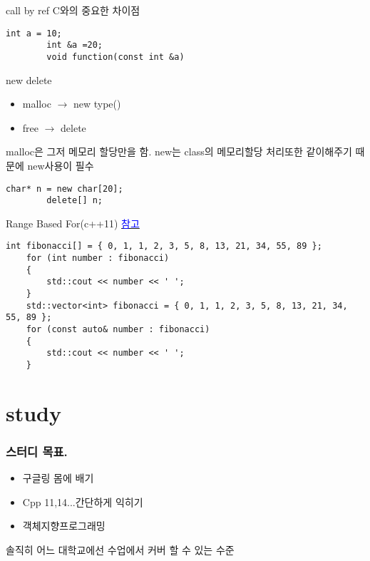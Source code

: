 \documentclass[10pt]{beamer}
\begin{document}

\begin{frame}[fragile]{call by ref}
    C와의 중요한 차이점
    \begin{lstlisting}[style = CStyle]
        int a = 10;
        int &a =20;
        void function(const int &a)
    \end{lstlisting}
\end{frame}

\begin{frame}[fragile]{new delete}
    \begin{itemize}
        \item malloc $\rightarrow$ new type()
        \item free $\rightarrow$ delete 
    \end{itemize}
    malloc은 그저 메모리 할당만을 함. new는 class의 메모리할당 처리또한 같이해주기 때문에 new사용이 필수
    \begin{lstlisting}[style = CStyle]
        char* n = new char[20];
        delete[] n;
    \end{lstlisting}
\end{frame}


\begin{frame}[fragile]{Range Based For(c++11)}
    \href{https://www.youtube.com/watch?v=sVoz36DYK5s&list=PLW_uvsSPlijtSmrhajc3Y02G86lOieQOb}{\textcolor{blue}{참고}}
    
    \begin{lstlisting}[style = CStyle]
    int fibonacci[] = { 0, 1, 1, 2, 3, 5, 8, 13, 21, 34, 55, 89 }; 
    for (int number : fibonacci)
    {
        std::cout << number << ' ';
    }
    std::vector<int> fibonacci = { 0, 1, 1, 2, 3, 5, 8, 13, 21, 34, 55, 89 }; 
    for (const auto& number : fibonacci) 
    {
        std::cout << number << ' ';
    }
    \end{lstlisting}

\end{frame}    

\section{study}


\begin{frame}[fragile] 
    \frametitle{스터디 목표.}
    \begin{itemize}
        \item 구글링 몸에 배기
        \item Cpp 11,14...간단하게 익히기
        \item 객체지향프로그래밍
    \end{itemize}
    솔직히 어느 대학교에선 수업에서 커버 할 수 있는 수준
\end{frame}
\end{document}
